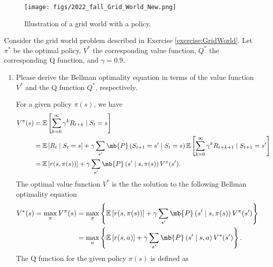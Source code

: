 \begin{figure}[H]
    \centering
    \texttt{[image: figs/2022\_fall\_Grid\_World\_New.png]}
    \caption{Illustration of a grid world with a policy.}\label{fig:gridworld}
\end{figure}
\clearpage




\begin{exercise}
    Consider the grid world problem described in Exercise \ref{exercise:GridWorld}. Let $\pi^*$ be the optimal policy, $V^*$ the corresponding value function, $Q^*$ the corresponding Q function, and $\gamma=0.9$.

    \begin{enumerate}
        \item
            Please derive the Bellman optimality equation in terms of the value function $V^*$ and the Q function $Q^*$, respectively.
            \begin{solution}
                For a given policy $\pi(s)$, we have
                \begin{align*}
                    V^\pi(s)
                     & = \mathbb{E}\left[\sum_{k=0}^{\infty} \gamma^k R_{t+k} \mid S_t = s\right]                                                                                                               \\
                     & = \mathbb{E}\left[R_t \mid S_t = s\right] +  \gamma \sum_{s'}\mb{P}\left(S_{t+1} = s' \mid S_t = s\right)\mathbb{E}\left[\sum_{k=0}^{\infty} \gamma^k R_{t+k+1} \mid S_{t+1} = s'\right] \\
                     & = \mathbb{E}\left[r(s, \pi(s))\right] + \gamma \sum_{s'}\mb{P}\left(s' \mid s, \pi(s)\right)V^\pi(s').
                \end{align*}
                The optimal value function $V^*$ is the the solution to the following Bellman optimality equation
                \begin{align*}
                    V^*(s) = \max_{\pi} V^\pi(s)
                     & = \max_{\pi} \left\{\mathbb{E}\left[r(s, \pi(s))\right] + \gamma \sum_{s'}\mb{P}\left(s' \mid s, \pi(s)\right)V^\pi(s')\right\} \\
                     & = \max_{a} \left\{\mathbb{E}\left[r(s, a)\right] + \gamma \sum_{s'}\mb{P}\left(s' \mid s, a\right)V^*(s')\right\}.
                \end{align*}
                The Q function for the given policy $\pi(s)$ is defined as
                \begin{align*}

\end{align*}
\end{solution}
\end{enumerate}
\end{exercise}
